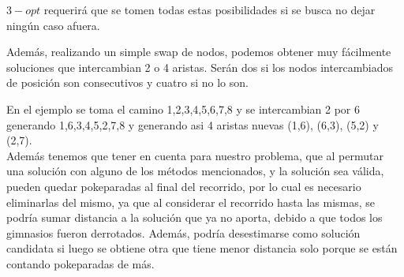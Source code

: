 $3-opt$ requerirá que se tomen todas estas posibilidades si se busca no dejar ningún caso afuera.

Además, realizando un simple swap de nodos, podemos obtener muy fácilmente soluciones que intercambian 2 o 4 aristas. Serán dos si los nodos intercambiados de posición son consecutivos y cuatro si no lo son.

\begin{figure}[h] 
 \centering
       \label{fig:Movimiento swap2}
    \label{fig:Movimiento Swap}
\end{figure}


En el ejemplo se toma el camino 1,2,3,4,5,6,7,8 y se intercambian 2 por 6 generando 1,6,3,4,5,2,7,8 y generando asi 4 aristas nuevas (1,6), (6,3), (5,2) y (2,7).\\

Además tenemos que tener en cuenta para nuestro problema, que al permutar una solución con alguno de los métodos mencionados, y la solución sea válida, pueden quedar pokeparadas al final del recorrido, por lo cual es necesario eliminarlas del mismo, ya que al considerar el recorrido hasta las mismas, se podría sumar distancia a la solución que ya no aporta, debido a que todos los gimnasios fueron derrotados. Además, podría desestimarse como solución candidata si luego se obtiene otra que tiene menor distancia solo porque se están contando pokeparadas de más.\\

